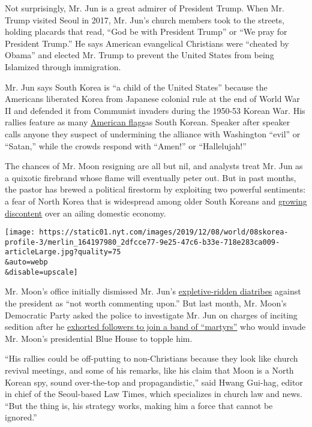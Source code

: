 Not surprisingly, Mr. Jun is a great admirer of President Trump. When
Mr. Trump visited Seoul in 2017, Mr. Jun's church members took to the
streets, holding placards that read, ``God be with President Trump'' or
``We pray for President Trump.'' He says American evangelical Christians
were ``cheated by Obama'' and elected Mr. Trump to prevent the United
States from being Islamized through immigration.

Mr. Jun says South Korea is ``a child of the United States'' because the
Americans liberated Korea from Japanese colonial rule at the end of
World War II and defended it from Communist invaders during the 1950-53
Korean War. His rallies feature as many
\href{https://www.youtube.com/watch?v=rJ1zzu9xLMk}{American flags}as
South Korean. Speaker after speaker calls anyone they suspect of
undermining the alliance with Washington ``evil'' or ``Satan,'' while
the crowds​ respond with ``Amen!'' or ``Hallelujah!''

​The chances of Mr. Moon resigning are all but nil, and analysts treat
Mr. Jun as a quixotic firebrand whose flame will eventually peter out.
But in past months, the pastor has brewed a political firestorm by
exploiting two powerful sentiments: a fear of North Korea that is
widespread among older South Koreans and
\href{https://www.nytimes.com/2019/10/21/world/asia/south-korea-cho-kuk-gold-spoon-elite.html?searchResultPosition=2}{growing
discontent} over an ailing domestic economy.

\texttt{[image: https://static01.nyt.com/images/2019/12/08/world/08skorea-profile-3/merlin\_164197980\_2dfcce77-9e25-47c6-b33e-718e283ca009-articleLarge.jpg?quality=75\\\&auto=webp\\\&disable=upscale]}

Mr. Moon's office initially dismissed Mr. Jun's
\href{https://www.youtube.com/watch?v=pjyYe_vhLmY}{expletive-ridden
diatribes} against the president as ``not worth commenting upon.'' But
last month, Mr. Moon's Democratic Party asked the police to investigate
Mr. Jun on charges of inciting sedition after he
\href{https://www.youtube.com/watch?v=ntrDZvMqomw}{exhorted followers to
join a band of ``martyrs''} who would invade Mr. Moon's presidential
Blue House to topple him.

``His rallies could be off-putting to non-Christians because they look
like church revival meetings, and some of his remarks, like his claim
that Moon is a North Korean spy, sound over-the-top and
propagandistic,'' said Hwang Gui-hag, editor in chief of the Seoul-based
Law Times, which specializes in church law and news. ``But the thing is,
his strategy works, making him a force that cannot be ignored.''

